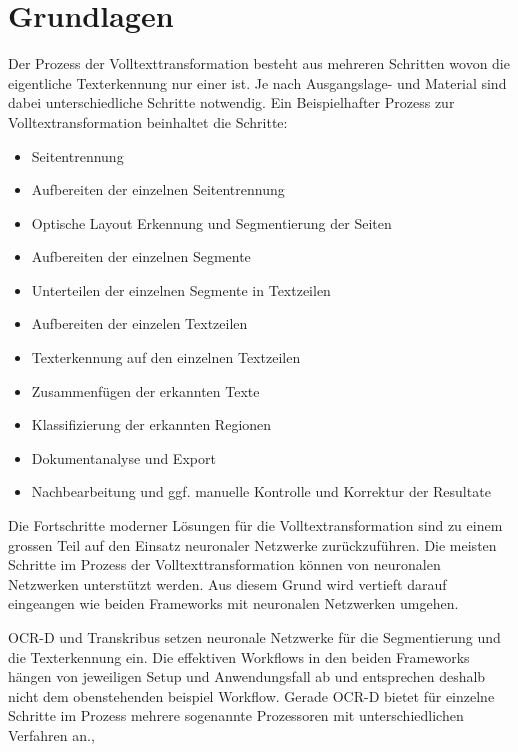\documentclass[a4paper,oneside, 12pt]{report}
\begin{document}
\chapter{Grundlagen}\label{sec:grundlagen}
Der Prozess der Volltexttransformation besteht aus mehreren Schritten wovon die eigentliche Texterkennung nur einer ist. Je nach Ausgangslage- und Material sind dabei unterschiedliche Schritte notwendig. Ein Beispielhafter Prozess zur Volltextransformation beinhaltet die Schritte:
\begin{itemize}\itemsep=0.5pt
  \item Seitentrennung
  \item Aufbereiten der einzelnen Seitentrennung
  \item Optische Layout Erkennung und Segmentierung der Seiten
  \item Aufbereiten der einzelnen Segmente
  \item Unterteilen der einzelnen Segmente in Textzeilen
  \item Aufbereiten der einzelen Textzeilen
  \item Texterkennung auf den einzelnen Textzeilen
  \item Zusammenfügen der erkannten Texte
  \item Klassifizierung der erkannten Regionen
  \item Dokumentanalyse und Export
  \item Nachbearbeitung und ggf. manuelle Kontrolle und Korrektur der Resultate
\end{itemize}

Die Fortschritte moderner Lösungen für die Volltextransformation sind zu einem grossen Teil auf den Einsatz neuronaler Netzwerke zurückzuführen. Die meisten Schritte im Prozess der Volltexttransformation können von neuronalen Netzwerken unterstützt werden. Aus diesem Grund wird vertieft darauf eingeangen wie beiden Frameworks mit neuronalen Netzwerken umgehen. 

OCR-D und Transkribus setzen neuronale Netzwerke für die Segmentierung und die Texterkennung ein. Die effektiven Workflows in den beiden Frameworks hängen von jeweiligen Setup und Anwendungsfall ab und entsprechen deshalb nicht dem obenstehenden beispiel Workflow. Gerade OCR-D bietet für einzelne Schritte im Prozess mehrere sogenannte Prozessoren mit unterschiedlichen Verfahren an.\cite{transkribus}, \cite{ocrdworkflows} 
 
\end{document}
